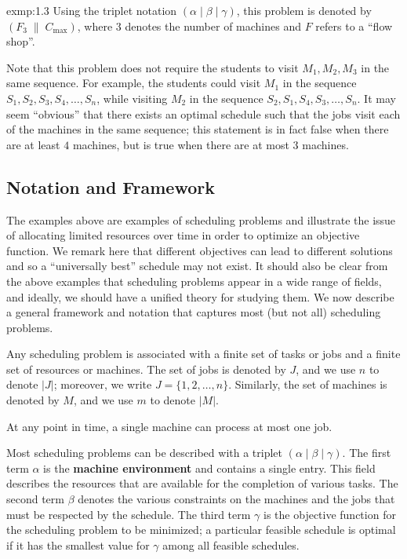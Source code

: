 \begin{exmp}{exmp:1.3}
    Using the triplet notation $(\alpha \mid \beta \mid \gamma)$, 
    this problem is denoted by $(F_3\;\|\;C_{\max})$, where $3$ denotes 
    the number of machines and $F$ refers to a ``flow shop''.

    Note that this problem does not require the students to visit $M_1, 
    M_2, M_3$ in the same sequence. For example, the students could 
    visit $M_1$ in the sequence $S_1, S_2, S_3, S_4, \dots, S_n$, while visiting 
    $M_2$ in the sequence $S_2, S_1, S_4, S_3, \dots, S_n$. It may seem 
    ``obvious'' that there exists an optimal schedule such that the jobs 
    visit each of the machines in the same sequence; this statement is 
    in fact false when there are at least $4$ machines, but is true when 
    there are at most $3$ machines. 
\end{exmp}

\subsection{Notation and Framework}\label{subsec:1.2}
The examples above are examples of scheduling problems and illustrate the 
issue of allocating limited resources over time in order to optimize an 
objective function. We remark here that different objectives can lead to 
different solutions and so a ``universally best'' schedule may not exist. 
It should also be clear from the above examples that scheduling problems
appear in a wide range of fields, and ideally, we should have a unified theory 
for studying them. We now describe a general framework and notation that 
captures most (but not all) scheduling problems.

Any scheduling problem is associated with a finite set of tasks or jobs and 
a finite set of resources or machines. The set of jobs is denoted by $J$, 
and we use $n$ to denote $|J|$; moreover, we write $J = \{1, 2, \dots, n\}$. 
Similarly, the set of machines is denoted by $M$, and we use $m$ to denote $|M|$.

At any point in time, a single machine can process at most one job. 

Most scheduling problems can be described with a triplet $(\alpha \mid 
\beta \mid \gamma)$. The first term $\alpha$ is the {\bf machine environment}
and contains a single entry. This field describes the resources that are 
available for the completion of various tasks. The second term $\beta$ 
denotes the various constraints on the machines and the jobs that must be 
respected by the schedule. The third term $\gamma$ is the objective function 
for the scheduling problem to be minimized; a particular feasible schedule 
is optimal if it has the smallest value for $\gamma$ among all feasible 
schedules. 

